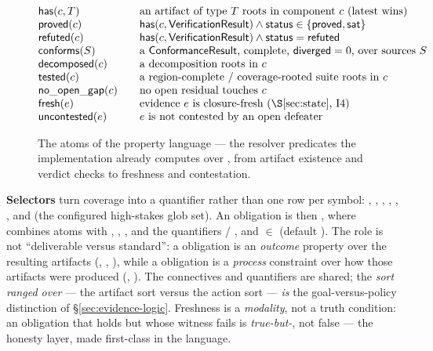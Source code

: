 \begin{figure}[H]
\centering
\small
\[
\begin{array}{@{}l@{\qquad}l@{}}
\id{has}(c,T)      & \text{an artifact of type $T$ roots in component $c$ (latest wins)}\\
\id{proved}(c)     & \id{has}(c,\id{VerificationResult}) \land \id{status} \in \{\id{proved},\id{sat}\}\\
\id{refuted}(c)    & \id{has}(c,\id{VerificationResult}) \land \id{status} = \id{refuted}\\
\id{conforms}(S)   & \text{a $\id{ConformanceResult}$, complete, $\id{diverged}=0$, over sources $S$}\\
\id{decomposed}(c) & \text{a decomposition roots in $c$}\\
\id{tested}(c)     & \text{a region-complete / coverage-rooted suite roots in $c$}\\
\id{no\_open\_gap}(c) & \text{no open residual touches $c$}\\
\id{fresh}(e)      & \text{evidence $e$ is closure-fresh (\S\ref{sec:state}, I4)}\\
\id{uncontested}(e)& \text{$e$ is not contested by an open defeater}
\end{array}
\]
\caption{The atoms of the property language --- the resolver predicates the implementation already computes over \trace{}, from artifact existence and verdict checks to freshness and contestation.}
\label{fig:goal-atoms}
\end{figure}

\noindent\textbf{Selectors} turn coverage into a quantifier rather than one row per symbol:
, , , , ,
, and  (the configured high-stakes glob set). An obligation is then
, where  combines atoms with , , ,
\code{=>} and the quantifiers  / , and
 \(\in\) \code{\{[met], [governed]\}} (default \code{[met]}). The role is not
``deliverable versus standard'': a \code{[met]} obligation is an \emph{outcome} property over the
resulting artifacts (, , ), while a
\code{[governed]} obligation is a \emph{process} constraint over how those artifacts were produced
(, ). The connectives and quantifiers are
shared; the \emph{sort ranged over} --- the artifact sort versus the action sort --- \emph{is} the
goal-versus-policy distinction of \S\ref{sec:evidence-logic}. Freshness is a \emph{modality}, not a
truth condition: an obligation that holds but whose witness fails  is
\emph{true-but-}, not false --- the honesty layer, made first-class in the language.

